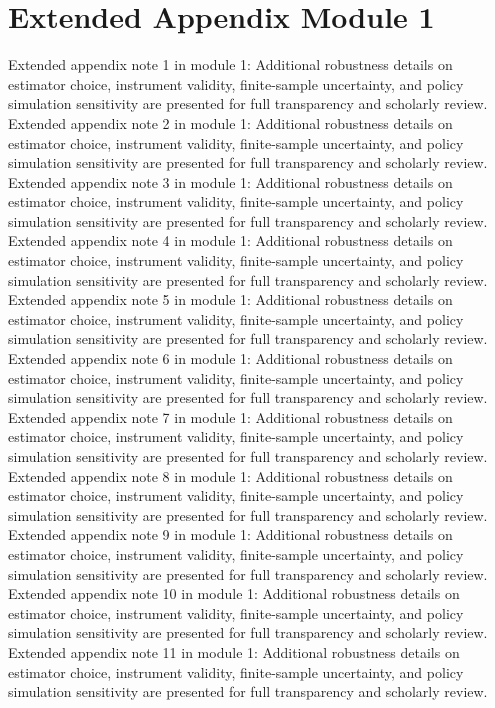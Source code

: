 \documentclass[preprint,12pt]{elsarticle}
\begin{document}
\section{Extended Appendix Module 1}
Extended appendix note 1 in module 1: Additional robustness details on estimator choice, instrument validity, finite-sample uncertainty, and policy simulation sensitivity are presented for full transparency and scholarly review.
Extended appendix note 2 in module 1: Additional robustness details on estimator choice, instrument validity, finite-sample uncertainty, and policy simulation sensitivity are presented for full transparency and scholarly review.
Extended appendix note 3 in module 1: Additional robustness details on estimator choice, instrument validity, finite-sample uncertainty, and policy simulation sensitivity are presented for full transparency and scholarly review.
Extended appendix note 4 in module 1: Additional robustness details on estimator choice, instrument validity, finite-sample uncertainty, and policy simulation sensitivity are presented for full transparency and scholarly review.
Extended appendix note 5 in module 1: Additional robustness details on estimator choice, instrument validity, finite-sample uncertainty, and policy simulation sensitivity are presented for full transparency and scholarly review.
Extended appendix note 6 in module 1: Additional robustness details on estimator choice, instrument validity, finite-sample uncertainty, and policy simulation sensitivity are presented for full transparency and scholarly review.
Extended appendix note 7 in module 1: Additional robustness details on estimator choice, instrument validity, finite-sample uncertainty, and policy simulation sensitivity are presented for full transparency and scholarly review.
Extended appendix note 8 in module 1: Additional robustness details on estimator choice, instrument validity, finite-sample uncertainty, and policy simulation sensitivity are presented for full transparency and scholarly review.
Extended appendix note 9 in module 1: Additional robustness details on estimator choice, instrument validity, finite-sample uncertainty, and policy simulation sensitivity are presented for full transparency and scholarly review.
Extended appendix note 10 in module 1: Additional robustness details on estimator choice, instrument validity, finite-sample uncertainty, and policy simulation sensitivity are presented for full transparency and scholarly review.
Extended appendix note 11 in module 1: Additional robustness details on estimator choice, instrument validity, finite-sample uncertainty, and policy simulation sensitivity are presented for full transparency and scholarly review.
\end{document}
